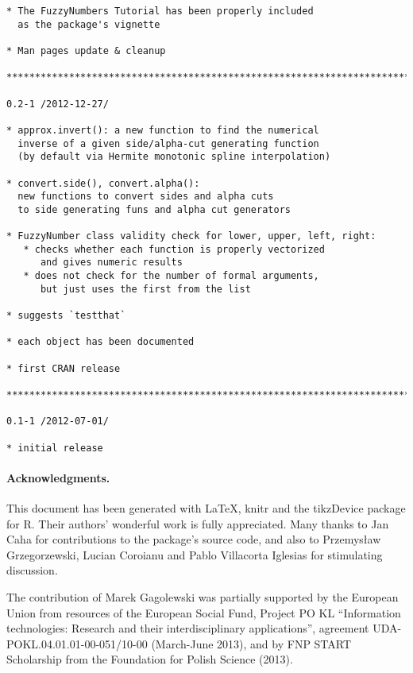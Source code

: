 \documentclass[11pt]{article}\usepackage{graphicx, color}
\makeatletter
\newenvironment{kframe}{%
 \def\at@end@of@kframe{}%
 \ifinner\ifhmode%
  \def\at@end@of@kframe{\end{minipage}}%
  \begin{minipage}{\columnwidth}%
 \fi\fi%
 \def\FrameCommand##1{\hskip\@totalleftmargin \hskip-\fboxsep
 \colorbox{shadecolor}{##1}\hskip-\fboxsep
     \hskip-\linewidth \hskip-\@totalleftmargin \hskip\columnwidth}%
 \MakeFramed {\advance\hsize-\width
   \@totalleftmargin\z@ \linewidth\hsize
   \@setminipage}}%
 {\par\unskip\endMakeFramed%
 \at@end@of@kframe}
\newenvironment{knitrout}{}{} %
\newcommand{\package}[1]{\textsf{#1}\xspace}
\newcommand{\lang}[1]{\textsf{#1}\xspace}
\newcommand{\R}{\lang{R}}
\makeatother
\begin{document}
\begin{knitrout}
\begin{kframe}
\begin{verbatim}
* The FuzzyNumbers Tutorial has been properly included
  as the package's vignette

* Man pages update & cleanup

***************************************************************************

0.2-1 /2012-12-27/

* approx.invert(): a new function to find the numerical
  inverse of a given side/alpha-cut generating function
  (by default via Hermite monotonic spline interpolation)

* convert.side(), convert.alpha():
  new functions to convert sides and alpha cuts
  to side generating funs and alpha cut generators

* FuzzyNumber class validity check for lower, upper, left, right:
   * checks whether each function is properly vectorized
      and gives numeric results
   * does not check for the number of formal arguments,
      but just uses the first from the list

* suggests `testthat`

* each object has been documented

* first CRAN release

***************************************************************************

0.1-1 /2012-07-01/

* initial release
\end{verbatim}
\end{kframe}
\end{knitrout}



\paragraph{Acknowledgments.}
This document has been generated with \LaTeX, \package{knitr} and
the \package{tikzDevice} package for \R.
Their authors' wonderful work is fully appreciated.
Many thanks to Jan Caha for contributions to the package's source code,
and also to Przemys\l{}aw Grzegorzewski, Lucian Coroianu
and Pablo Villacorta Iglesias for stimulating discussion.



The contribution of Marek Gagolewski was partially supported
by the European Union from resources of the European Social Fund, Project PO KL 
``Information technologies: Research and their interdisciplinary
applications'', agreement UDA-POKL.04.01.01-00-051/10-00 (March-June 2013),
and by FNP START Scholarship from the Foundation for Polish Science (2013).






\end{document}
